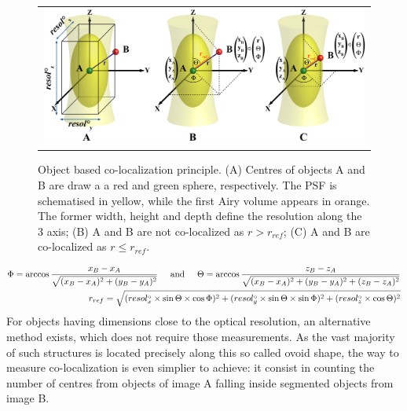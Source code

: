 \documentclass[]{spie}  %
\begin{document}
\begin{figure}[!ht]
\begin{center}
\begin{tabular}{c}
\includegraphics[width=0.75\linewidth]{figs/objFig.png}
\end{tabular}
\end{center}
\caption[obj] 
{\label{fig:obj}
Object based co-localization principle. (A) Centres of objects A and B are draw a a red and green sphere, respectively. The PSF is schematised in yellow, while the first Airy volume appears in orange. The former width, height and depth define the resolution along the 3 axis; (B) A and B are not co-localized as $r>r_{ref}$; (C) A and B are co-localized as $r\le r_{ref}$.}
\end{figure}
\begin{eqnarray}
\Phi=\arccos\frac{x_{B}-x_{A}}{\sqrt{(x_{B}-x_{A})^2+(y_{B}-y_{A})^2}} \hspace{0.5cm} \mbox{and} \hspace{0.5cm} \Theta=\arccos\frac{z_{B}-z_{A}}{\sqrt{(x_{B}-x_{A})^2+(y_{B}-y_{A})^2+(z_{B}-z_{A})^2}}\label{phiTheta}\\
r_{ref}=\sqrt{(resol^\circ_{x}\times\sin\Theta\times\cos\Phi )^2+(resol^\circ_{y}\times\sin\Theta\times\sin\Phi)^2+(resol^\circ_{z}\times\cos\Theta)^2\label{refDist}}
\label{eqn:objBased}
\end{eqnarray}
For objects having dimensions close to the optical resolution, an alternative method exists, which does not require those measurements. As the vast majority of such structures is located  precisely along this so called ovoid shape, the way to measure co-localization is even simplier to achieve: it consist in counting the number of centres from objects of image A falling inside segmented objects from image B.
\end{document}
